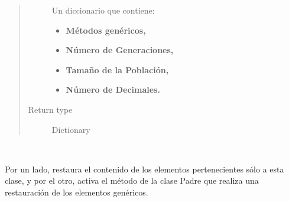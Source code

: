\documentclass[class=report, crop=false]{standalone}
\begin{document}
\begin{fulllineitems}
\begin{fulllineitems}
\begin{quote}
\begin{description}
Un diccionario que contiene:

\begin{itemize}
\item \textbf{Métodos genéricos,}
\item \textbf{Número de Generaciones,}
\item \textbf{Tamaño de la Población,}
\item \textbf{Número de Decimales.}
\end{itemize}

\item[{Return type}] \leavevmode
Dictionary
\end{description}\end{quote}

\end{fulllineitems}

\begin{fulllineitems}

~
\vspace{-0.3cm}

Por un lado, restaura el contenido de los elementos pertenecientes 
sólo a esta clase, y por el otro, activa el método de la clase 
Padre que realiza una restauración de los elementos genéricos.

\end{fulllineitems}

\end{fulllineitems}
\end{document}
